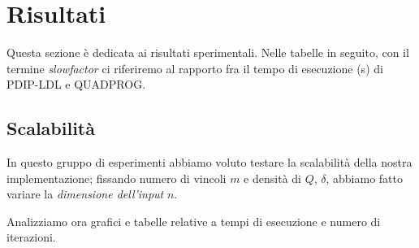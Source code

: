 \section{Risultati}
Questa sezione è dedicata ai risultati sperimentali.
Nelle tabelle in seguito, con il termine \textit{slowfactor} ci riferiremo al rapporto fra il tempo di esecuzione (s) di PDIP-LDL e QUADPROG.

\subsection*{Scalabilità}

 In questo gruppo di esperimenti abbiamo voluto testare la scalabilità della nostra implementazione; fissando numero di vincoli $m$ e densità di $Q$, $\delta$, abbiamo fatto variare la \textit{dimensione dell'input} $n$.

Analizziamo ora grafici e tabelle relative a tempi di esecuzione e numero di iterazioni. 

